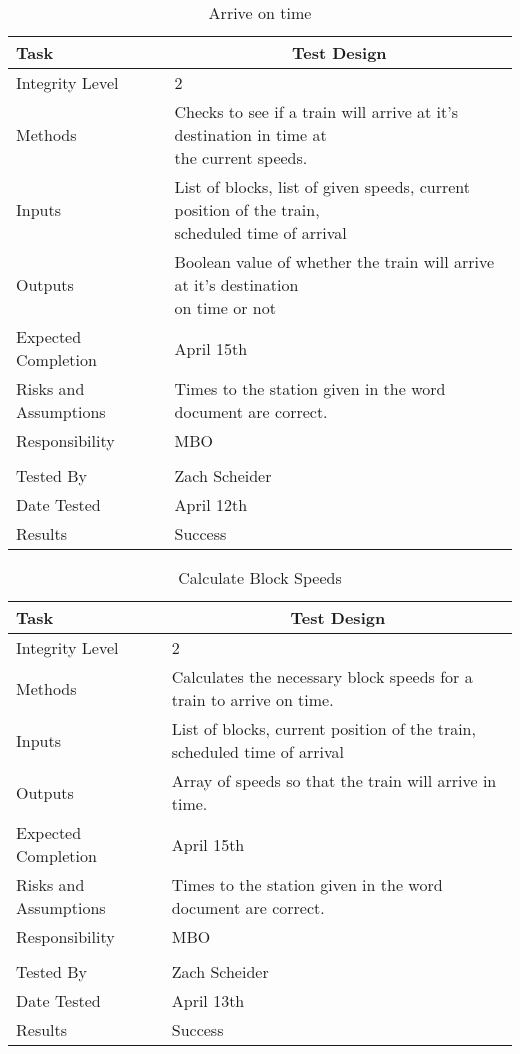 \documentclass[]{article}
\begin{document}
\begin{table}[H]
	\centering
	\caption{Arrive on time}
	\begin{tabular}{|l|l|}
		\hline
		Task & \multicolumn{1}{c|}{Test Design} \\ \hline
		Integrity Level & 2 \\ \hline
		Methods & \parbox[t]{10cm}{Checks to see if a train will arrive at it's destination in time at \\the current speeds.} \\ \hline
		Inputs &  \parbox[t]{10cm}{List of blocks, list of given speeds, current position of the train, \\scheduled time of arrival}\\ \hline
		Outputs &  \parbox[t]{10cm}{Boolean value of whether the train will arrive at it's destination \\on time or not} \\ \hline
		Expected Completion & \parbox[t]{10cm}{April 15th}\\ \hline
		Risks and Assumptions & \parbox[t]{10cm}{Times to the station given in the word document are correct.} \\ \hline
		Responsibility & MBO\\ \hline
			\\ \hline
		Tested By   &  Zach Scheider\\	\hline
		Date Tested & \parbox[t]{10cm}{April 12th}\\ \hline
		Results & Success\\ \hline
	\end{tabular}
\end{table}

\begin{table}[H]
	\centering
	\caption{Calculate Block Speeds}
	\begin{tabular}{|l|l|}
		\hline
		Task & \multicolumn{1}{c|}{Test Design} \\ \hline
		Integrity Level & 2 \\ \hline
		Methods & Calculates the necessary block speeds for a train to arrive on time.\\ \hline
		Inputs &  List of blocks, current position of the train, scheduled time of arrival\\ \hline
		Outputs &  Array of speeds so that the train will arrive in time. \\ \hline
		Expected Completion & \parbox[t]{10cm}{April 15th}\\ \hline
		Risks and Assumptions & \parbox[t]{10cm}{Times to the station given in the word document are correct.} \\ \hline
		Responsibility & MBO\\ \hline
			\\ \hline
		Tested By   &  Zach Scheider\\	\hline
		Date Tested & \parbox[t]{10cm}{April 13th}\\ \hline
		Results & Success\\ \hline
	\end{tabular}
\end{table}
\end{document}

